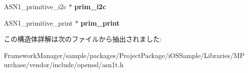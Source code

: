\begin{DoxyCompactItemize}
\item 
\hypertarget{struct_a_s_n1___p_r_i_m_i_t_i_v_e___f_u_n_c_s__st_abee28722d73a140d6fdff1ee669843da}{}A\+S\+N1\+\_\+primitive\+\_\+i2c $\ast$ {\bfseries prim\+\_\+i2c}\label{struct_a_s_n1___p_r_i_m_i_t_i_v_e___f_u_n_c_s__st_abee28722d73a140d6fdff1ee669843da}

\item 
\hypertarget{struct_a_s_n1___p_r_i_m_i_t_i_v_e___f_u_n_c_s__st_a8fd7a2f06014a2bb7c4bd274407eb61d}{}A\+S\+N1\+\_\+primitive\+\_\+print $\ast$ {\bfseries prim\+\_\+print}\label{struct_a_s_n1___p_r_i_m_i_t_i_v_e___f_u_n_c_s__st_a8fd7a2f06014a2bb7c4bd274407eb61d}

\end{DoxyCompactItemize}


この構造体詳解は次のファイルから抽出されました\+:\begin{DoxyCompactItemize}
\item 
Framework\+Manager/sample/packages/\+Project\+Package/i\+O\+S\+Sample/\+Libraries/\+M\+Purchase/vendor/include/openssl/asn1t.\+h\end{DoxyCompactItemize}
